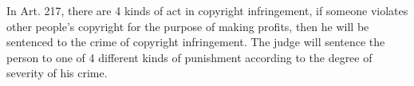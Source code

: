 \documentclass{IOS-Book-Article}
\begin{document}
\normalsize
\noindent 
In Art. 217, there are 4 kinds of act in copyright infringement, if someone violates other people's copyright for the purpose of making profits, then he will be sentenced to the crime of copyright infringement. The judge will sentence the person to one of 4 different kinds of punishment according to the degree of severity of his crime. %
%
%
%
%
%
\end{document}
